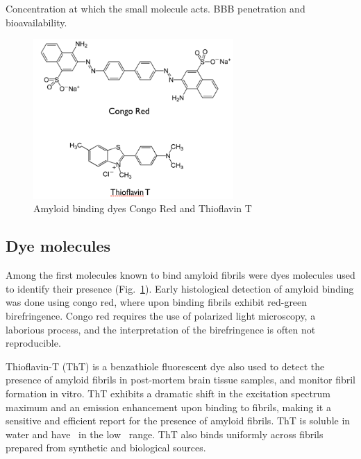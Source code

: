 Concentration at which the small molecule acts.  BBB penetration and bioavailability.

\begin{figure}
\centering
\includegraphics[width=3in]{figures/introduction/dyes.png}
\caption[Small molecule binders]{Amyloid binding dyes Congo Red and Thioflavin T}
\label{fig:amyloid_dyes}
\end{figure}

\subsection{Dye molecules}

Among the first molecules known to bind amyloid fibrils were dyes molecules used to identify their presence (Fig.~\ref{fig:amyloid_dyes}). Early histological detection of amyloid binding was done using congo red, where upon binding fibrils exhibit red-green birefringence. Congo red requires the use of polarized light microscopy, a laborious process, and the interpretation of the birefringence is often not reproducible.


Thioflavin-T (ThT) is a benzathiole fluorescent dye also used to detect the presence of amyloid fibrils in post-mortem brain tissue samples, and monitor fibril formation in vitro. ThT exhibits a dramatic shift in the excitation spectrum maximum and an emission enhancement upon binding to fibrils, making it a sensitive and efficient report for the presence of amyloid fibrils.  ThT is soluble in water and have \KD\ in the low \micromolar\ range.  ThT also binds uniformly across fibrils prepared from synthetic and biological sources.

